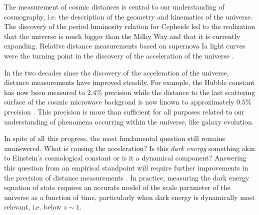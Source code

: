 The measurement of cosmic distances is central to our understanding of
cosmography, i.e. the description of the geometry and kinematics of
the universe. The discovery of the period luminosity relation for
Cepheids led to the realization that the universe is much bigger than
the Milky Way and that it is currently expanding. Relative distance
measurements based on supernova Ia light curves were the turning point
in the discovery of the acceleration of the universe
\citep{Riess:1998p21184,Per++99}.

In the two decades since the discovery of the acceleration of the
universe, distance measurements have improved steadily. For example,
the Hubble constant has now been measured to 2.4\% precision
\citep{Rie++16} while the distance to the last scattering surface of
the cosmic microwave backgrond is now known to approximately 0.5\%
precision \citep[depending on the assumed cosmological
model]{WMAP9,Pla15}. This precision is more than sufficient for all
purposes related to our understanding of phenomena occurring within
the universe, like galaxy evolution.

In spite of all this progress, the most fundamental question still
remains unanswered. What is causing the acceleration? Is this {\it
dark energy} something akin to Einstein's cosmological constant or is
it a dynamical component? Answering this question from an empirical
standpoint will require further improvements in the precision of
distance measurements \citep{Suy++12,Wei++13,Kim++15,Rie++16}.  In
practice, measuring the dark energy equation of state requires an
accurate model of the scale parameter of the universe as a function of
time, particularly when dark energy is dynamically most relevant,
i.e. below $z\sim1$.


